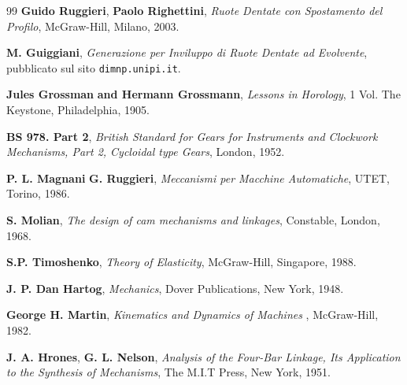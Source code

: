 \begin{thebibliography}{99}
 {\bfseries Guido Ruggieri},
	{\bfseries Paolo Righettini},
        {\em Ruote Dentate con Spostamento del Profilo},
      	McGraw-Hill, Milano, 2003.

 {\bfseries M. Guiggiani},
	{\em Generazione per Inviluppo di Ruote Dentate ad Evolvente},
	pubblicato sul sito {\tt dimnp.unipi.it}.

 {\bfseries Jules Grossman}
	{\bfseries and Hermann Grossmann},
        {\em Lessons in Horology}, 1 Vol.
        The Keystone, Philadelphia, 1905.

 {\bfseries BS 978. Part 2},
	{\em British Standard for Gears for Instruments and Clockwork
	Mechanisms, Part 2, Cycloidal type Gears},
	London, 1952.

 {\bfseries P. L. Magnani}
	{\bfseries G. Ruggieri},
        {\em Meccanismi per Macchine Automatiche},
        UTET, Torino, 1986.

 {\bfseries S. Molian},
        {\em The design of cam mechanisms and linkages},
        Constable, London, 1968.

 {\bfseries S.P. Timoshenko},
        {\em Theory of Elasticity},
        McGraw-Hill, Singapore, 1988.

 {\bfseries  J. P. Dan Hartog},
        {\em Mechanics},
        Dover Publications, New York, 1948.
 
 {\bfseries George H. Martin},
        {\em Kinematics and Dynamics of Machines },
        McGraw-Hill, 1982.

 {\bfseries J. A. Hrones},
	{\bfseries G. L. Nelson},
        {\em Analysis of the Four-Bar Linkage, Its Application to
        the Synthesis of Mechanisms},
        The M.I.T Press, New York, 1951.

\end{thebibliography}

\endinput
